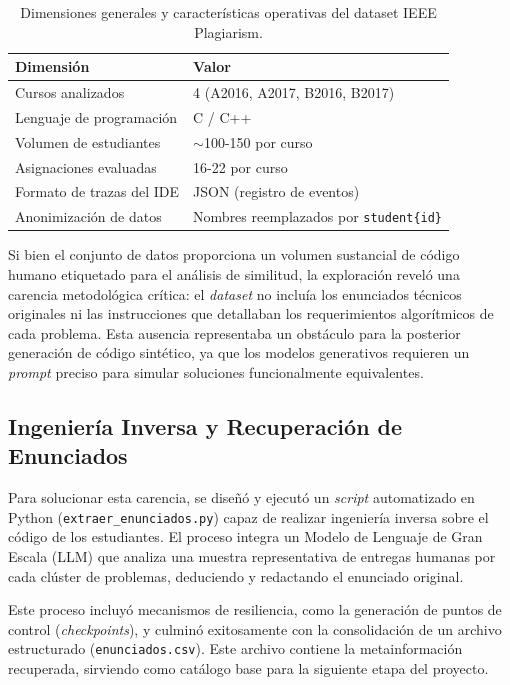 \begin{table}[H]
    \centering
    \caption{Dimensiones generales y características operativas del dataset IEEE Plagiarism.}
    \begin{tabular}{|l|l|}
        \hline
        \textbf{Dimensión} & \textbf{Valor} \\ \hline
        Cursos analizados & 4 (A2016, A2017, B2016, B2017) \\ \hline
        Lenguaje de programación & C / C++ \\ \hline
        Volumen de estudiantes & $\sim$100-150 por curso \\ \hline
        Asignaciones evaluadas & 16-22 por curso \\ \hline
        Formato de trazas del IDE & JSON (registro de eventos) \\ \hline
        Anonimización de datos & Nombres reemplazados por \texttt{student\{id\}} \\ \hline
    \end{tabular}
    \label{tab:dimensiones-dataset}
\end{table}

Si bien el conjunto de datos proporciona un volumen sustancial de código humano etiquetado para el análisis de similitud, la exploración reveló una carencia metodológica crítica: el \textit{dataset} no incluía los enunciados técnicos originales ni las instrucciones que detallaban los requerimientos algorítmicos de cada problema. Esta ausencia representaba un obstáculo para la posterior generación de código sintético, ya que los modelos generativos requieren un \textit{prompt} preciso para simular soluciones funcionalmente equivalentes.

\subsection{Ingeniería Inversa y Recuperación de Enunciados}

Para solucionar esta carencia, se diseñó y ejecutó un \textit{script} automatizado en Python (\texttt{extraer\_enunciados.py}) capaz de realizar ingeniería inversa sobre el código de los estudiantes. El proceso integra un Modelo de Lenguaje de Gran Escala (LLM) que analiza una muestra representativa de entregas humanas por cada clúster de problemas, deduciendo y redactando el enunciado original. 

Este proceso incluyó mecanismos de resiliencia, como la generación de puntos de control (\textit{checkpoints}), y culminó exitosamente con la consolidación de un archivo estructurado (\texttt{enunciados.csv}). Este archivo contiene la metainformación recuperada, sirviendo como catálogo base para la siguiente etapa del proyecto.

